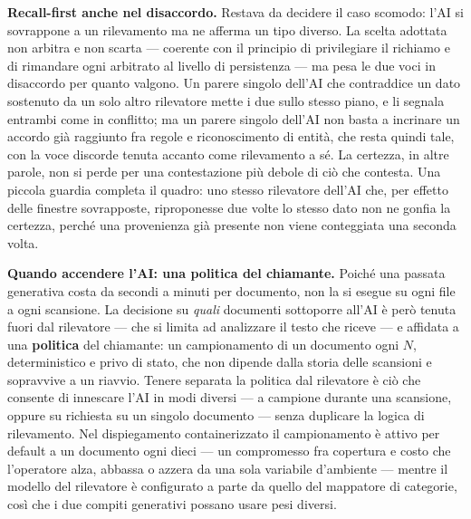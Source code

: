 \textbf{Recall-first anche nel disaccordo.} Restava da decidere il caso scomodo: l'AI si sovrappone a un rilevamento ma ne afferma un tipo diverso. La scelta adottata non arbitra e non scarta --- coerente con il principio di privilegiare il richiamo e di rimandare ogni arbitrato al livello di persistenza --- ma pesa le due voci in disaccordo per quanto valgono. Un parere singolo dell'AI che contraddice un dato sostenuto da un solo altro rilevatore mette i due sullo stesso piano, e li segnala entrambi come in conflitto; ma un parere singolo dell'AI non basta a incrinare un accordo già raggiunto fra regole e riconoscimento di entità, che resta quindi tale, con la voce discorde tenuta accanto come rilevamento a sé. La certezza, in altre parole, non si perde per una contestazione più debole di ciò che contesta. Una piccola guardia completa il quadro: uno stesso rilevatore dell'AI che, per effetto delle finestre sovrapposte, riproponesse due volte lo stesso dato non ne gonfia la certezza, perché una provenienza già presente non viene conteggiata una seconda volta. \medskip

\textbf{Quando accendere l'AI: una politica del chiamante.} Poiché una passata generativa costa da secondi a minuti per documento, non la si esegue su ogni file a ogni scansione. La decisione su \emph{quali} documenti sottoporre all'AI è però tenuta fuori dal rilevatore --- che si limita ad analizzare il testo che riceve --- e affidata a una \textbf{politica} del chiamante: un campionamento di un documento ogni $N$, deterministico e privo di stato, che non dipende dalla storia delle scansioni e sopravvive a un riavvio. Tenere separata la politica dal rilevatore è ciò che consente di innescare l'AI in modi diversi --- a campione durante una scansione, oppure su richiesta su un singolo documento --- senza duplicare la logica di rilevamento. Nel dispiegamento containerizzato il campionamento è attivo per default a un documento ogni dieci --- un compromesso fra copertura e costo che l'operatore alza, abbassa o azzera da una sola variabile d'ambiente --- mentre il modello del rilevatore è configurato a parte da quello del mappatore di categorie, così che i due compiti generativi possano usare pesi diversi. \medskip

